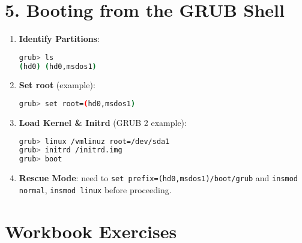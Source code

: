 \documentclass[12pt,a4paper]{report}
\begin{document}
\section*{5. Booting from the GRUB Shell}

\begin{enumerate}
    \item \textbf{Identify Partitions}:
    \begin{lstlisting}[language=bash]
grub> ls
(hd0) (hd0,msdos1)
    \end{lstlisting}

    \item \textbf{Set root} (example):
    \begin{lstlisting}[language=bash]
grub> set root=(hd0,msdos1)
    \end{lstlisting}

    \item \textbf{Load Kernel \& Initrd} (GRUB 2 example):
    \begin{lstlisting}[language=bash]
grub> linux /vmlinuz root=/dev/sda1
grub> initrd /initrd.img
grub> boot
    \end{lstlisting}

    \item \textbf{Rescue Mode}: need to \texttt{set prefix=(hd0,msdos1)/boot/grub} and \texttt{insmod normal}, \texttt{insmod linux} before proceeding.
\end{enumerate}

\section*{Workbook Exercises}
\end{document}
